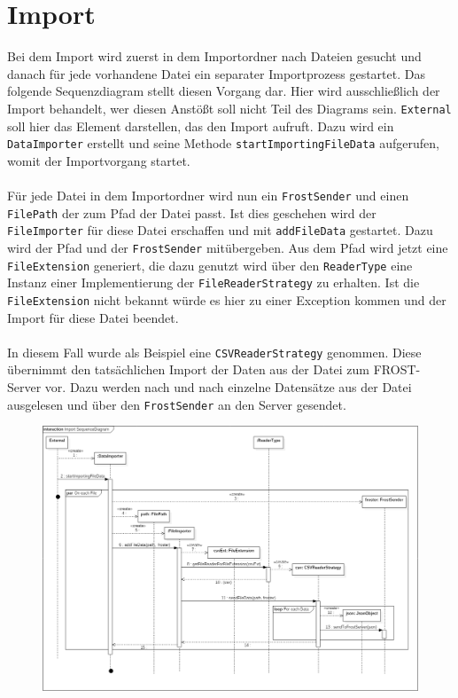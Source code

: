 \section{Import}
Bei dem Import wird zuerst in dem Importordner nach Dateien gesucht und danach für jede vorhandene Datei ein separater Importprozess gestartet. Das folgende Sequenzdiagram stellt diesen Vorgang dar. Hier wird ausschließlich der Import behandelt, wer diesen Anstößt soll nicht Teil des Diagrams sein. \texttt{External} soll hier das Element darstellen, das den Import aufruft. Dazu wird ein \texttt{DataImporter} erstellt und seine Methode \texttt{startImportingFileData} aufgerufen, womit der Importvorgang startet.\\\\
Für jede Datei in dem Importordner wird nun ein \texttt{FrostSender} und einen \texttt{FilePath} der zum Pfad der Datei passt. Ist dies geschehen wird der \texttt{FileImporter} für diese Datei erschaffen und mit \texttt{addFileData} gestartet. Dazu wird der Pfad und der \texttt{FrostSender} mitübergeben. Aus dem Pfad wird jetzt eine \texttt{FileExtension} generiert, die dazu genutzt wird über den \texttt{ReaderType} eine Instanz einer Implementierung der \texttt{FileReaderStrategy} zu erhalten. Ist die \texttt{FileExtension} nicht bekannt würde es hier zu einer Exception kommen und der Import für diese Datei beendet.\\\\
In diesem Fall wurde als Beispiel eine \texttt{CSVReaderStrategy} genommen. Diese übernimmt den tatsächlichen Import der Daten aus der Datei zum FROST-Server vor. Dazu werden nach und nach einzelne Datensätze aus der Datei ausgelesen und über den \texttt{FrostSender} an den Server gesendet.

\begin{figure}[!hbp]
	\centering
	\includegraphics[width=\linewidth]{images/import/ImportSequenceDiagram.png}
\end{figure}
\newpage

